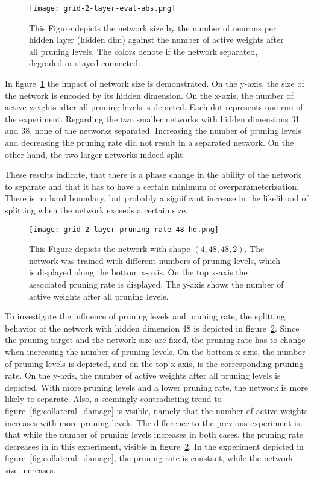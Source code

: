 \begin{figure}[ht]
    \centering
    \texttt{[image: grid-2-layer-eval-abs.png]}
    \caption{This Figure depicts the network size by the number of neurons per hidden layer (hidden dim) against the number of active weights after all pruning levels.
    The colors denote if the network separated, degraded or stayed connected.}\label{fig:grid-1}
\end{figure}

In figure~\ref{fig:grid-1} the impact of network size is demonstrated.
On the y-axis, the size of the network is encoded by its hidden dimension.
On the x-axis, the number of active weights after all pruning levels is depicted.
Each dot represents one run of the experiment.
Regarding the two smaller networks with hidden dimensions 31 and 38, none of the networks separated. 
Increasing the number of pruning levels and decreasing the pruning rate did not result in a separated network.
On the other hand, the two larger networks indeed split.

These results indicate, that there is a phase change in the ability of the network to separate and that it has to have a certain minimum of overparameterization.
There is no hard boundary, but probably a significant increase in the likelihood of splitting when the network exceeds a certain size.

\begin{figure}[ht]
    \centering
    \texttt{[image: grid-2-layer-pruning-rate-48-hd.png]}
    \caption{This Figure depicts the network with shape $(4,48,48,2)$.
    The network was trained with different numbers of pruning levels, which is displayed along the bottom x-axis.
    On the top x-axis the associated pruning rate is displayed.
    The y-axis shows the number of active weights after all pruning levels.
    }\label{fig:grid-2}
\end{figure}

To investigate the influence of pruning levels and pruning rate, the splitting behavior of the network with hidden dimension 48 is depicted in figure~\ref{fig:grid-2}.
Since the pruning target and the network size are fixed, the pruning rate has to change when increasing the number of pruning levels.
On the bottom x-axis, the number of pruning levels is depicted, and on the top x-axis, is the corresponding pruning rate.
On the y-axis, the number of active weights after all pruning levels is depicted.
With more pruning levels and a lower pruning rate, the network is more likely to separate.
Also, a seemingly contradicting trend to figure~\ref{fig:collateral_damage} is visible, namely that the number of active weights increases with more pruning levels.
The difference to the previous experiment is, that while the number of pruning levels increases in both cases, the pruning rate decreases in in this experiment, visible in figure~\ref{fig:grid-2}. In the experiment depicted in figure~\ref{fig:collateral_damage}, the pruning rate is constant, while the network size increases.

